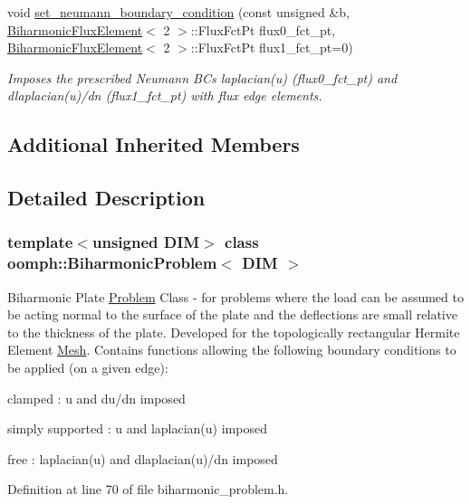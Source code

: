 \begin{DoxyCompactItemize}
void \hyperlink{classoomph_1_1BiharmonicProblem_a19509193167f4b969aa9f6cb6c2586b2}{set\+\_\+neumann\+\_\+boundary\+\_\+condition} (const unsigned \&b, \hyperlink{classoomph_1_1BiharmonicFluxElement}{Biharmonic\+Flux\+Element}$<$ 2 $>$\+::Flux\+Fct\+Pt flux0\+\_\+fct\+\_\+pt, \hyperlink{classoomph_1_1BiharmonicFluxElement}{Biharmonic\+Flux\+Element}$<$ 2 $>$\+::Flux\+Fct\+Pt flux1\+\_\+fct\+\_\+pt=0)
\begin{DoxyCompactList}\small\item\em Imposes the prescribed Neumann B\+Cs laplacian(u) (flux0\+\_\+fct\+\_\+pt) and dlaplacian(u)/dn (flux1\+\_\+fct\+\_\+pt) with flux edge elements. \end{DoxyCompactList}\end{DoxyCompactItemize}
\subsection*{Additional Inherited Members}


\subsection{Detailed Description}
\subsubsection*{template$<$unsigned D\+IM$>$\newline
class oomph\+::\+Biharmonic\+Problem$<$ D\+I\+M $>$}

Biharmonic Plate \hyperlink{classoomph_1_1Problem}{Problem} Class -\/ for problems where the load can be assumed to be acting normal to the surface of the plate and the deflections are small relative to the thickness of the plate. Developed for the topologically rectangular Hermite Element \hyperlink{classoomph_1_1Mesh}{Mesh}. Contains functions allowing the following boundary conditions to be applied (on a given edge)\+: 


\begin{DoxyItemize}
\item clamped \+: u and du/dn imposed
\item simply supported \+: u and laplacian(u) imposed
\item free \+: laplacian(u) and dlaplacian(u)/dn imposed 
\end{DoxyItemize}

Definition at line 70 of file biharmonic\+\_\+problem.\+h.




